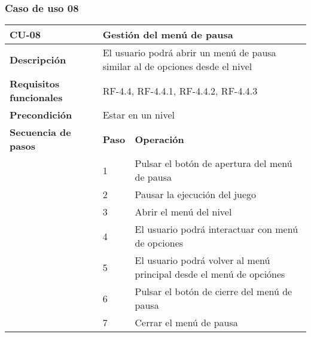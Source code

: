 \subsubsection{Caso de uso 08}
\begin{longtable}{lll}
\textbf{CU-08}                                   & \multicolumn{2}{l}{Gestión del menú de pausa}                                                              \\ \hline
\endfirsthead
%
\endhead
%
\textbf{Descripción}                             & \multicolumn{2}{l}{El usuario podrá abrir un menú de pausa similar al de opciones desde el nivel}          \\ \hline
\textbf{Requisitos funcionales}                  & \multicolumn{2}{l}{RF-4.4, RF-4.4.1, RF-4.4.2, RF-4.4.3}                                                   \\ \hline
\textbf{Precondición}                            & \multicolumn{2}{l}{Estar en un nivel}                                                                      \\ \hline
\multicolumn{1}{l|}{\textbf{Secuencia de pasos}} & \textbf{Paso}             & \textbf{Operación}                                                             \\ \cline{2-3} 
\multicolumn{1}{l|}{}                            & 1                         & Pulsar el botón de apertura del menú de pausa                                  \\
\multicolumn{1}{l|}{}                            & 2                         & Pausar la ejecución del juego                                                  \\
\multicolumn{1}{l|}{}                            & 3                         & Abrir el menú del nivel                                                        \\
\multicolumn{1}{l|}{}                            & 4                         & El usuario podrá interactuar con menú de opciones                              \\
\multicolumn{1}{l|}{}                            & 5                         & El usuario podrá volver al menú principal desde el menú de opciónes            \\
\multicolumn{1}{l|}{}                            & 6                         & Pulsar el botón de cierre del menú de pausa                                    \\
\multicolumn{1}{l|}{}                            & 7                         & Cerrar el menú de pausa                                                        \\

\end{longtable}
